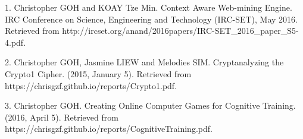 

\begin{cvskills}

  \cvskill
    {1.} %
    {Christopher GOH and KOAY Tze Min. Context Aware Web-mining Engine. IRC Conference on Science, Engineering and Technology (IRC-SET), May 2016. Retrieved from http://ircset.org/anand/2016papers/IRC-SET\_2016\_paper\_S5-4.pdf.} %

  \cvskill
    {2.} %
    {Christopher GOH, Jasmine LIEW and Melodies SIM. Cryptanalyzing the Crypto1 Cipher.
(2015, January 5). Retrieved from https://chrisgzf.github.io/reports/Crypto1.pdf.} %

  \cvskill
    {3.} %
    {Christopher GOH. Creating Online Computer Games for Cognitive Training. (2016, April
5). Retrieved from https://chrisgzf.github.io/reports/CognitiveTraining.pdf.} %

\end{cvskills}
